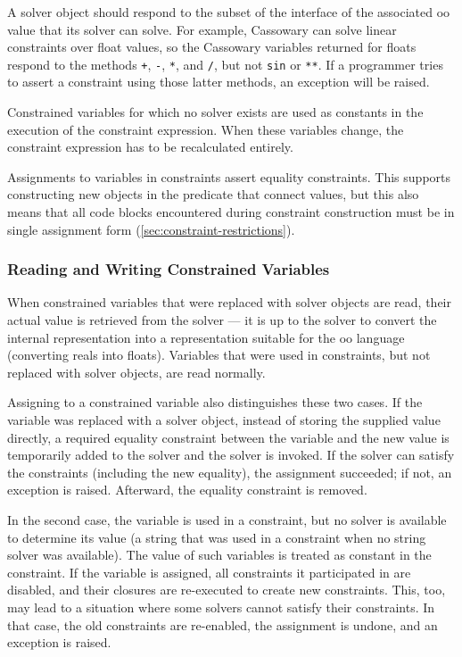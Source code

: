 A solver object should respond to the subset of the interface of the
associated \ac{oo} value that its solver can solve. For example,
Cassowary can solve linear constraints over float values, so the
Cassowary variables returned for floats respond to the methods
\lstinline{+}, \lstinline{-}, \lstinline{*}, and \lstinline{/}, but
not \lstinline{sin} or \lstinline{**}. If a programmer tries to assert
a constraint using those latter methods, an exception will be raised.

Constrained variables for which no solver exists are used as constants
in the execution of the constraint expression. When these variables
change, the constraint expression has to be recalculated entirely.

Assignments to variables in constraints assert equality
constraints. This supports constructing new objects in
the predicate that connect values, but this also means that all
code blocks encountered during constraint construction must be in
single assignment form (\autoref{sec:constraint-restrictions}).

\subsubsection{Reading and Writing Constrained Variables}
When constrained variables that were replaced with solver objects are
read, their actual value is retrieved from the solver --- it is up to
the solver to convert the internal representation into a
representation suitable for the \ac{oo} language (\eg converting
reals into floats). Variables that were used in constraints, but not
replaced with solver objects, are read normally.

Assigning to a constrained variable also distinguishes these two
cases. If the variable was replaced with a solver object, instead of
storing the supplied value directly, a required equality constraint
between the variable and the new value is temporarily added to the
solver and the solver is invoked.  If the solver can satisfy the
constraints (including the new \DIFdelbegin {}\DIFdelend equality), the assignment
succeeded; if not, an exception is raised.  Afterward, the equality
constraint is removed.

In the second case, the variable is used in a constraint, but no
solver is available to determine its value (\eg a string that was used
in a constraint when no string solver was available). The value of
such variables is treated as constant in the constraint. If the
variable is assigned, all constraints it participated in are disabled,
and their closures are re-executed to create new constraints. This,
too, may lead to a situation where some solvers cannot satisfy their
constraints. In that case, the old constraints are re-enabled, the
assignment is undone, and an exception is raised. \DIFaddbegin {}
\DIFaddend 

